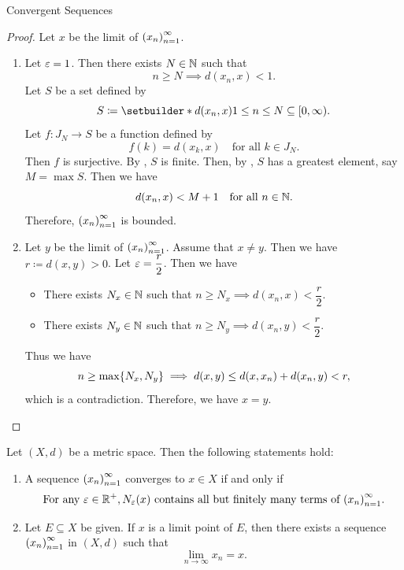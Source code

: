 \begin{section}{Convergent Sequences}
\begin{proof}
    Let $x$ be the limit of $\paren*{x_{n}}_{n = 1}^{\infty}$.
    \begin{enumerate}[label=\textbf{(\Alph*)}]
        \item Let $\veps = 1$. Then there exists $N \in \N$ such that
        \[
        n \geq N \implies d(x_{n}, x) < 1.
        \]
        Let $S$ be a set defined by
        \[
        S \coloneqq \setbuilder*{d(x_{n}, x)}{1 \leq n \leq N} \subseteq [0, \infty).
        \]
        Let $f: J_{N} \to S$ be a function defined by
        \[
        f(k) = d(x_{k}, x) \quad \text{for all } k \in J_{N}.
        \]
        Then $f$ is surjective. By , $S$ is finite. Then, by
        , $S$ has a greatest element, say $M = \max S$. Then we have
        \[
        d(x_{n}, x) < M + 1 \quad \text{for all } n \in \N.
        \]
        Therefore, $\paren*{x_{n}}_{n = 1}^{\infty}$ is bounded.
        \item Let $y$ be the limit of $\paren*{x_{n}}_{n = 1}^{\infty}$. Assume that $x \neq y$.
        Then we have $r \coloneqq d(x, y) > 0$. Let $\veps = \dfrac{r}{2}$. Then we have
        \begin{itemize}
            \item There exists $N_{x} \in \N$ such that $n \geq N_{x} \implies d(x_{n}, x) < \dfrac{r}{2}$.
            \item There exists $N_{y} \in \N$ such that $n \geq N_{y} \implies d(x_{n}, y) < \dfrac{r}{2}$.
        \end{itemize}
        Thus we have
        \[
        n \geq \max\set*{N_{x}, N_{y}} \implies d(x, y) \leq d(x, x_{n}) + d(x_{n}, y) < r,
        \]
        which is a contradiction. Therefore, we have $x = y$.
    \end{enumerate}
\end{proof}

\bigskip

\begin{theorem} \label{thm:Neighborhood}
    Let $(X, d)$ be a metric space. Then the following statements hold:
    \begin{enumerate}[label=\textbf{(\Alph*)}]
        \item A sequence $\paren*{x_{n}}_{n = 1}^{\infty}$ converges to $x \in X$ if and only if
        \[
        \text{For any } \veps \in \R^{+}, N_{\veps}(x) \text{ contains all but
        finitely many terms of } \paren*{x_{n}}_{n = 1}^{\infty}.
        \]
        \item Let $E \subseteq X$ be given. If $x$ is a limit point of $E$, then there exists
        a sequence $\paren*{x_{n}}_{n = 1}^{\infty}$ in $(X, d)$ such that
        \[
        \lim_{n \to \infty} x_{n} = x.
        \]
    \end{enumerate}
\end{theorem}


\end{section}
